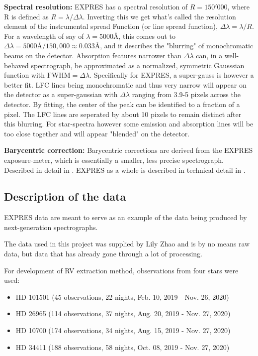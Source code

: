 \bigbreak
\noindent\textbf{Spectral resolution:}
EXPRES has a spectral resolution of $R = 150'000$, where R is defined as $R = \lambda / \Delta\lambda$. Inverting this we get what's called the resolution element of the instrumental spread Function (or line spread function), $\Delta\lambda = \lambda/R$. For a wavelength of say of $\lambda = 5000$Å, this comes out to $\Delta\lambda = 5000\text{Å}/150,000 \approx 0.033 $Å, and it describes the "blurring" of monochromatic beams on the detector. Absorption features narrower than $\Delta\lambda$ can, in a well-behaved spectrograph, be approximated as a normalized, symmetric Gausssian function with $\text{FWHM} = \Delta\lambda$. Specifically for EXPRES, a super-gauss is however a better fit\cite{yale_data}. LFC lines being monochromatic and thus very narrow will appear on the detector as a super-gaussian with $\Delta\lambda$ ranging from 3.9-5 pixels across the detector. By fitting, the center of the peak can be identified to a fraction of a pixel. The LFC lines are seperated by about 10 pixels to remain distinct after this blurring. For star-spectra however some emission and absorption lines will be too close together and will appear "blended" on the detector. 

\bigbreak
\noindent\textbf{Barycentric correction:}
Barycentric corrections are derived from the EXPRES exposure-meter, which is essentially a smaller, less precise spectrograph. Described in detail in \cite{barycentric_exposure_meter_blackman}. EXPRES as a whole is described in technical detail in \cite{EXPRES_technical_details_Jurgenson}.


\subsection{Description of the data}
EXPRES data are meant to serve as an example of the data being produced by next-generation spectrographs. 

The data used in this project was supplied by Lily Zhao and is by no means raw data, but data that has already gone through a lot of processing.

For development of RV extraction method, observations from four stars were used: 

\begin{itemize}
    \item HD 101501 (45 observations, 22 nights, Feb. 10, 2019 - Nov. 26, 2020)
    \item HD 26965 (114 observations, 37 nights, Aug. 20, 2019 - Nov. 27, 2020)
    \item HD 10700 (174 observations, 34 nights, Aug. 15, 2019 - Nov. 27, 2020)
    \item HD 34411 (188 observations, 58 nights, Oct. 08, 2019 - Nov. 27, 2020)
\end{itemize}


